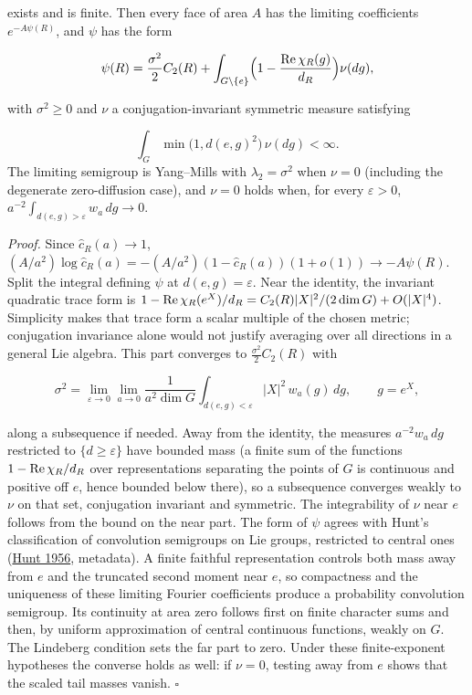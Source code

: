 \documentclass[11pt,a4paper]{article}
\begin{document}
exists and is finite. Then every face of area \(A\) has the limiting
coefficients \(e^{-A\psi(R)}\), and \(\psi\) has the form

\[\psi(R)=\frac{\sigma^2}2C_2(R)+\int_{G\setminus\{e\}}
\Bigl(1-\frac{{\rm Re}\,\chi_R(g)}{d_R}\Bigr)\nu(dg),\]

with \(\sigma^2\ge0\) and \(\nu\) a conjugation-invariant symmetric
measure satisfying

\[\int_G\min\bigl(1,d(e,g)^2\bigr)\,\nu(dg)<\infty.\] The limiting
semigroup is Yang--Mills with \(\lambda_2=\sigma^2\) when \(\nu=0\)
(including the degenerate zero-diffusion case), and \(\nu=0\) holds
when, for every \(\varepsilon>0\),
\(a^{-2}\int_{d(e,g)>\varepsilon}w_a\,dg\to0\).

\emph{Proof.} Since \(\hat c_R(a)\to1\),
\((A/a^2)\log\hat c_R(a)=-(A/a^2)(1-\hat c_R(a))(1+o(1))\to-A\psi(R)\).
Split the integral defining \(\psi\) at \(d(e,g)=\varepsilon\). Near the
identity, the invariant quadratic trace form is
\(1-{\rm Re}\,\chi_R(e^X)/d_R=C_2(R)|X|^2/(2\dim G)+O(|X|^4)\).
Simplicity makes that trace form a scalar multiple of the chosen metric;
conjugation invariance alone would not justify averaging over all
directions in a general Lie algebra. This part converges to
\(\frac{\sigma^2}2C_2(R)\) with

\[\sigma^2=\lim_{\varepsilon\to0}\lim_{a\to0}\frac1{a^2\dim G}
\int_{d(e,g)<\varepsilon}|X|^2\,w_a(g)\,dg,\qquad g=e^X,\]

along a subsequence if needed. Away from the identity, the measures
\(a^{-2}w_a\,dg\) restricted to \(\{d\ge\varepsilon\}\) have bounded
mass (a finite sum of the functions \(1-{\rm Re}\,\chi_R/d_R\) over
representations separating the points of \(G\) is continuous and
positive off \(e\), hence bounded below there), so a subsequence
converges weakly to \(\nu\) on that set, conjugation invariant and
symmetric. The integrability of \(\nu\) near \(e\) follows from the
bound on the near part. The form of \(\psi\) agrees with Hunt's
classification of convolution semigroups on Lie groups, restricted to
central ones
(\href{https://doi.org/10.1090/S0002-9947-1956-0079232-9}{Hunt 1956},
metadata). A finite faithful representation controls both mass away from
\(e\) and the truncated second moment near \(e\), so compactness and the
uniqueness of these limiting Fourier coefficients produce a probability
convolution semigroup. Its continuity at area zero follows first on
finite character sums and then, by uniform approximation of central
continuous functions, weakly on \(G\). The Lindeberg condition sets the
far part to zero. Under these finite-exponent hypotheses the converse
holds as well: if \(\nu=0\), testing away from \(e\) shows that the
scaled tail masses vanish. \(\square\)
\end{document}
